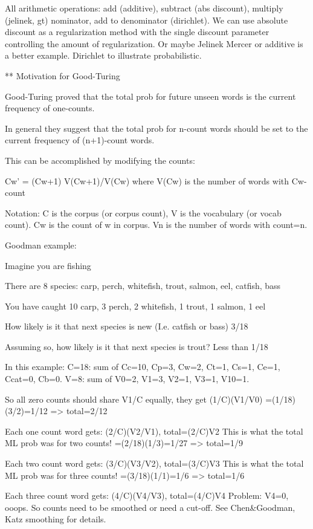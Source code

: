 \documentclass[ignorenonframetext]{beamer}
\begin{document}
All arithmetic operations: add (additive), subtract (abs discount),
multiply (jelinek, gt) nominator, add to denominator (dirichlet).  We
can use absolute discount as a regularization method with the single
discount parameter controlling the amount of regularization.  Or maybe
Jelinek Mercer or additive is a better example.  Dirichlet to
illustrate probabilistic.

** Motivation for Good-Turing

Good-Turing proved that the total prob for future unseen words is the
current frequency of one-counts.

In general they suggest that the total prob for n-count words should
be set to the current frequency of (n+1)-count words.

This can be accomplished by modifying the counts:

Cw' = (Cw+1) V(Cw+1)/V(Cw)  where V(Cw) is the number of words with Cw-count

Notation: C is the corpus (or corpus count), V is the vocabulary (or
vocab count).  Cw is the count of w in corpus.  Vn is the number of
words with count=n.

Goodman example:

Imagine you are fishing

There are 8 species: carp, perch, whitefish, trout, salmon, eel,
catfish, bass

You have caught 10 carp, 3 perch, 2 whitefish, 1 trout, 1 salmon, 1
eel

How likely is it that next species is new (I.e. catfish or bass) 
3/18

Assuming so, how likely is it that next species is trout?  
Less than 1/18


In this example: 
C=18: sum of Cc=10, Cp=3, Cw=2, Ct=1, Cs=1, Ce=1, Ccat=0, Cb=0.
V=8: sum of V0=2, V1=3, V2=1, V3=1, V10=1.

So all zero counts should share V1/C equally, they get (1/C)(V1/V0)
=(1/18)(3/2)=1/12 => total=2/12

Each one count word gets: (2/C)(V2/V1), total=(2/C)V2
This is what the total ML prob was for two counts!
=(2/18)(1/3)=1/27 => total=1/9

Each two count word gets: (3/C)(V3/V2), total=(3/C)V3
This is what the total ML prob was for three counts!
=(3/18)(1/1)=1/6 => total=1/6

Each three count word gets: (4/C)(V4/V3), total=(4/C)V4
Problem: V4=0, ooops.
So counts need to be smoothed or need a cut-off.  See Chen&Goodman,
Katz smoothing for details.
\end{document}
